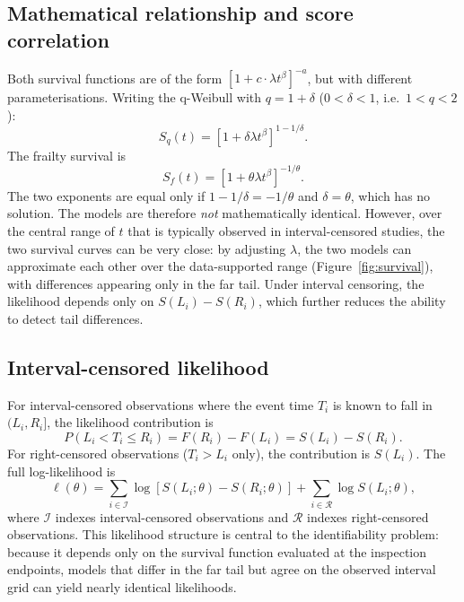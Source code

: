 \documentclass[12pt,a4paper]{article}
\begin{document}
\subsection{Mathematical relationship and score correlation}

Both survival functions are of the form $[1+c\cdot\lambda t^\beta]^{-a}$, but with different parameterisations. Writing the q-Weibull with $q=1+\delta$ ($0<\delta<1$, i.e.\ $1<q<2$):
\begin{equation}
S_q(t) = \left[1+\delta\lambda t^\beta\right]^{1-1/\delta}.
\end{equation}
The frailty survival is
\begin{equation}
S_f(t) = \left[1+\theta\lambda t^\beta\right]^{-1/\theta}.
\end{equation}
The two exponents are equal only if $1-1/\delta = -1/\theta$ and $\delta=\theta$, which has no solution. The models are therefore \emph{not} mathematically identical. However, over the central range of $t$ that is typically observed in interval-censored studies, the two survival curves can be very close: by adjusting $\lambda$, the two models can approximate each other over the data-supported range (Figure~\ref{fig:survival}), with differences appearing only in the far tail. Under interval censoring, the likelihood depends only on $S(L_i)-S(R_i)$, which further reduces the ability to detect tail differences.

\subsection{Interval-censored likelihood}

For interval-censored observations where the event time $T_i$ is known to fall in $(L_i, R_i]$, the likelihood contribution is
\begin{equation}
P(L_i < T_i \le R_i) = F(R_i) - F(L_i) = S(L_i) - S(R_i).
\end{equation}
For right-censored observations ($T_i > L_i$ only), the contribution is $S(L_i)$. The full log-likelihood is
\begin{equation}
\ell(\theta) = \sum_{i \in \mathcal{I}} \log[S(L_i;\theta) - S(R_i;\theta)] + \sum_{i \in \mathcal{R}} \log S(L_i;\theta),
\end{equation}
where $\mathcal{I}$ indexes interval-censored observations and $\mathcal{R}$ indexes right-censored observations. This likelihood structure is central to the identifiability problem: because it depends only on the survival function evaluated at the inspection endpoints, models that differ in the far tail but agree on the observed interval grid can yield nearly identical likelihoods.
\end{document}
